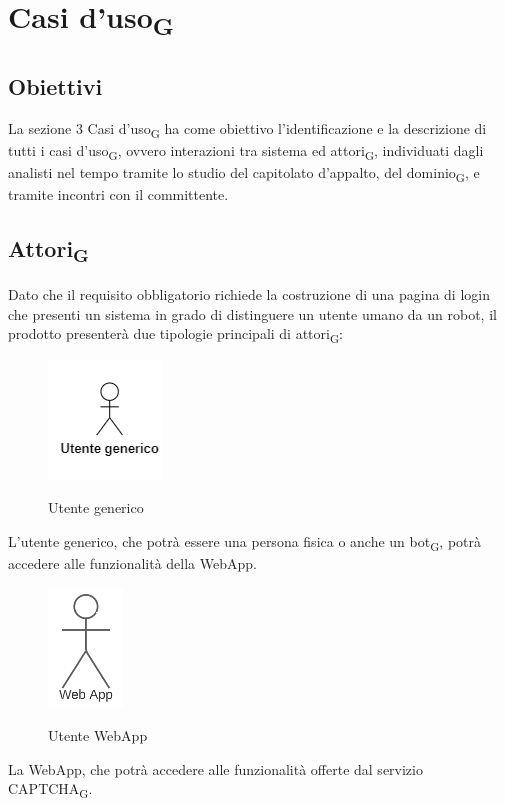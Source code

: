 \section{Casi d'uso\textsubscript{G}}

\subsection{Obiettivi}
La sezione 3 Casi d'uso\textsubscript{G} ha come obiettivo l'identificazione e la descrizione di tutti i casi d'uso\textsubscript{G}, ovvero interazioni tra sistema ed attori\textsubscript{G}, individuati dagli analisti nel tempo tramite lo studio del capitolato d'appalto, del dominio\textsubscript{G}, e tramite incontri con il committente.

\subsection{Attori\textsubscript{G}}
Dato che il requisito obbligatorio richiede la costruzione di una pagina di login che presenti un sistema in grado di distinguere un utente umano da un robot, il prodotto presenterà due tipologie principali di attori\textsubscript{G}:
\begin{figure}[H]
    \centering
    \includegraphics[scale = 1]{img/utente_generico.png}\\
    \caption{Utente generico}
\end{figure}
L'utente generico, che potrà essere una persona fisica o anche un bot\textsubscript{G}, potrà accedere alle funzionalità della WebApp. \\
\begin{figure}[H]
    \centering
    \includegraphics[scale = 0.8]{img/webapp.png}\\
    \caption{Utente WebApp}
\end{figure}
La WebApp, che potrà accedere alle funzionalità offerte dal servizio CAPTCHA\textsubscript{G}. \\

